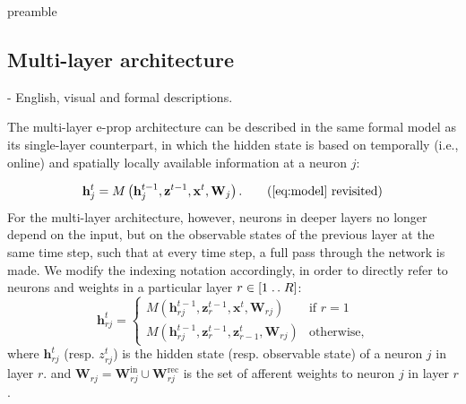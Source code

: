 	\begin{tcolorbox}[colback=orange]
	preamble

	\end{tcolorbox}

	\subsection{Multi-layer architecture}
		\begin{tcolorbox}[colback=orange]

		- English, visual and formal descriptions.

		\end{tcolorbox}

		The multi-layer e-prop architecture can be described in the same formal model as its single-layer counterpart, in which the hidden state is based on temporally (i.e., online) and spatially locally available information at a neuron $j$:

        \begin{equation}
        \mathbf{h}^t_j = M\left(\mathbf{h}_j^{t-1}, \mathbf{z}^{t-1}, \mathbf{x}^t, \mathbf{W}_j\right).\tag{\ref{eq:model} revisited}
        \end{equation}
        For the multi-layer architecture, however, neurons in deeper layers no longer depend on the input, but on the observable states of the previous layer at the same time step, such that at every time step, a full pass through the network is made.
        We modify the indexing notation accordingly, in order to directly refer to neurons and weights in a particular layer $r \in [1\mathrel{{.}\,{.}}\nobreak R]$:
        \begin{equation}\label{eq:ml_model}
        \mathbf{h}^t_{rj} = \begin{cases}
        M\left(\mathbf{h}_{rj}^{t-1}, \mathbf{z}_r^{t-1}, \mathbf{x}^t, \mathbf{W}_{rj}\right)       & \mbox{if } r = 1\\
        M\left(\mathbf{h}_{rj}^{t-1}, \mathbf{z}_r^{t-1}, \mathbf{z}_{r-1}^t, \mathbf{W}_{rj}\right) & \mbox{otherwise,}
        \end{cases}
        \end{equation}
        where $\mathbf{h}^t_{rj}$ (resp. $z^t_{rj}$) is the hidden state (resp. observable state) of a neuron $j$ in layer $r$. and $\mathbf{W}_{rj} = \mathbf{W}^\text{in}_{rj} \cup \mathbf{W}^\text{rec}_{rj}$ is the set of afferent weights to neuron $j$ in layer $r$.

